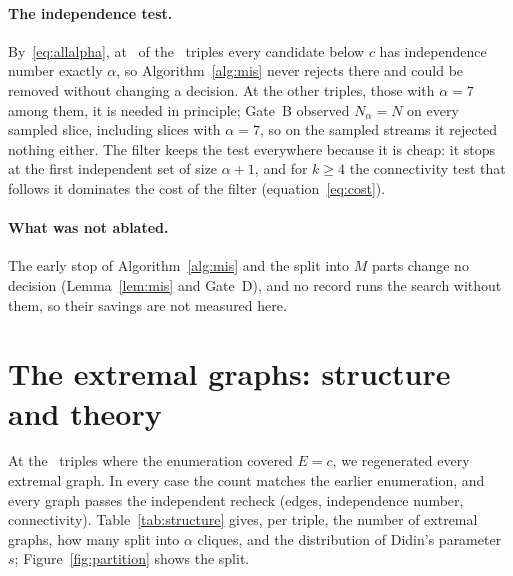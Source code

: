 \documentclass[11pt]{article}
\theoremstyle{definition}
\theoremstyle{remark}
\begin{document}
\begin{table}[t]
\centering\small
\caption{Ablation of the independence prune: the edge counts that both generators enumerated, with the candidates
generated, the wall-clock seconds and the graphs kept by the filter, and the factors by which the prune reduces the
candidates and the time.}
\label{tab:ablation}

\end{table}

\paragraph{The independence test.} By~\eqref{eq:allalpha}, at \nturancond\ of the \ntriples\ triples every candidate
below $c$ has independence number exactly $\alpha$, so Algorithm~\ref{alg:mis} never rejects there and could be
removed without changing a decision. At the other triples, those with $\alpha=7$ among them, it is needed in
principle; Gate~B observed $N_\alpha=N$ on every sampled slice, including slices with $\alpha=7$, so on the sampled
streams it rejected nothing either. The filter keeps the test everywhere because it is cheap: it stops at the first
independent set of size $\alpha+1$, and for $k\ge4$ the connectivity test that follows it dominates the cost of the
filter (equation~\eqref{eq:cost}).

\paragraph{What was not ablated.} The early stop of Algorithm~\ref{alg:mis} and the split into $M$ parts change no
decision (Lemma~\ref{lem:mis} and Gate~D), and no record runs the search without them, so their savings are not
measured here.

\section{The extremal graphs: structure and theory}\label{sec:extremal}

At the \nexttriples\ triples where the enumeration covered $E=c$, we regenerated every extremal graph. In every case
the count matches the earlier enumeration, and every graph passes the independent recheck (edges, independence number,
connectivity). Table~\ref{tab:structure} gives, per triple, the number of extremal graphs, how many split into $\alpha$
cliques, and the distribution of Didin's parameter $s$; Figure~\ref{fig:partition} shows the split.
\end{document}
